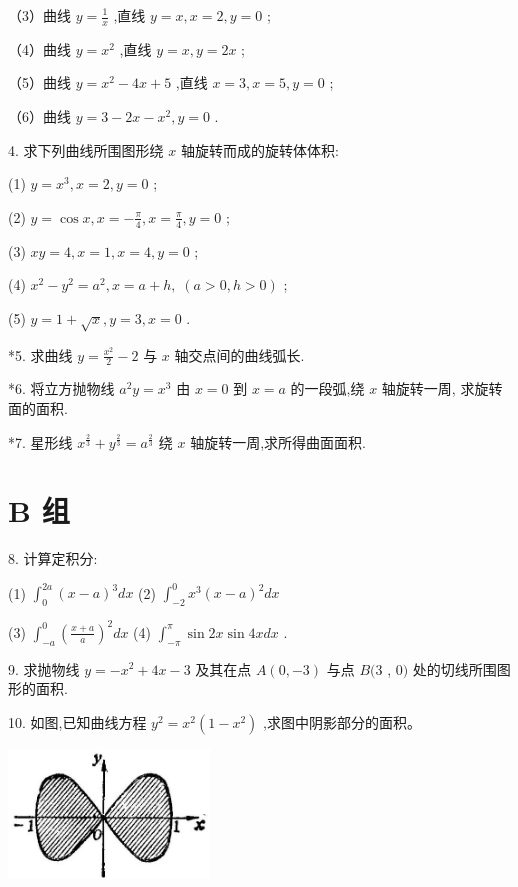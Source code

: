 \documentclass[lang=cn,newtx,12pt,scheme=chinese]{elegantbook}
\begin{document}
（3）曲线 \(y = \frac{1}{x}\) ,直线 \(y = x,x = 2,y = 0\) ;

（4）曲线 \(y = {x}^{2}\) ,直线 \(y = x,y = {2x}\) ;

（5）曲线 \(y = {x}^{2} - {4x} + 5\) ,直线 \(x = 3,x = 5,y = 0\) ;

（6）曲线 \(y = 3 - {2x} - {x}^{2},y = 0\) .

4. 求下列曲线所围图形绕 \(x\) 轴旋转而成的旋转体体积:

(1) \(y = {x}^{3},x = 2,y = 0\) ;

(2) \(y = \cos x,x = - \frac{\pi }{4},x = \frac{\pi }{4},y = 0\) ;

(3) \({xy} = 4,x = 1,x = 4,y = 0\) ;

(4) \({x}^{2} - {y}^{2} = {a}^{2},x = a + h,\;\left( {a > 0,h > 0}\right)\) ;

(5) \(y = 1 + \sqrt{x},y = 3,x = 0\) .

*5. 求曲线 \(y = \frac{{x}^{2}}{2} - 2\) 与 \(x\) 轴交点间的曲线弧长.

*6. 将立方抛物线 \({a}^{2}y = {x}^{3}\) 由 \(x = 0\) 到 \(x = a\) 的一段弧,绕 \(x\) 轴旋转一周, 求旋转面的面积.

*7. 星形线 \({x}^{\frac{2}{3}} + {y}^{\frac{2}{3}} = {a}^{\frac{2}{3}}\) 绕 \(x\) 轴旋转一周,求所得曲面面积.

\section*{B 组}

8. 计算定积分:

(1) \({\int }_{0}^{2a}{\left( x - a\right) }^{3}{dx}\) (2) \({\int }_{-2}^{0}{x}^{3}{\left( x - a\right) }^{2}{dx}\)

(3) \({\int }_{-a}^{0}{\left( \frac{x + a}{a}\right) }^{2}{dx}\) (4) \({\int }_{-\pi }^{\pi }\sin {2x}\sin {4xdx}\) .

9. 求抛物线 \(y = - {x}^{2} + {4x} - 3\) 及其在点 \(A\left( {0, - 3}\right)\) 与点 \(B(3\) , \(0)\) 处的切线所围图形的面积.

10. 如图,已知曲线方程 \({y}^{2} = {x}^{2}\left( {1 - {x}^{2}}\right)\) ,求图中阴影部分的面积。

\begin{center}
\includegraphics[max width=0.4\textwidth]{images/01912c18-5c3f-733d-b775-749ba9897a9d_253_827563.jpg}
\end{center}
\end{document}
